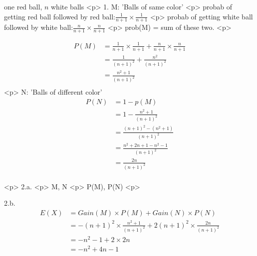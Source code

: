 one red ball, $n$ white balls
<p>
1. M: 'Balls of same color'
<p>
probab of getting red ball followed by red ball:$ \frac{1}{n+1} \times \frac{1}{n+1}$
<p>
probab of getting white ball followed by white ball:$ \frac{n}{n+1} \times \frac{n}{n+1}$
<p>
prob(M) = sum of these two.
<p>

$$\begin{aligned}P(M) &= \frac{1}{n+1} \times \frac{1}{n+1}  +  \frac{n}{n+1} \times \frac{n}{n+1}  \\
 &= \frac{1}{(n+1)^2}  +  \frac{n^2}{(n+1)^2}\\
 &= \frac{n^2+1}{(n+1)^2}\\
 \end{aligned}$$
<p>
 N: 'Balls of different color'
 $$\begin{aligned}P(N) &= 1- p(M)\\
&= 1-\frac{n^2+1}{(n+1)^2}\\ 
&= \frac{(n+1)^2-(n^2+1)}{(n+1)^2}\\ 
&= \frac{n^2 + 2n + 1 - n^2 -1}{(n+1)^2}\\ 
&= \frac{2n}{(n+1)^2}\\ 
 \end{aligned}$$

 <p>
 2.a.
 <p>
 M, N
 <p>
 P(M), P(N)
 <p>

 2.b.
$$\begin{aligned}E(X) &= Gain(M) \times P(M) + Gain(N) \times P(N)\\
&=-(n+1)^2 \times \frac{n^2+1}{(n+1)^2} +  2(n+1)^2 \times \frac{2n}{(n+1)^2}\\ 
&=-n^2-1 +  2 \times 2n\\ 
&=-n^2+4n-1\\
\end{aligned}$$

 
